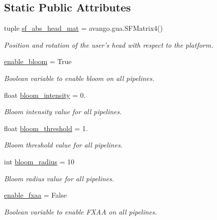 \subsection*{\-Static \-Public \-Attributes}
\begin{DoxyCompactItemize}
\item 
tuple \hyperlink{classlib_1_1User_1_1User_a633650301e37ff69cba4e51c2ed4f7a5}{sf\-\_\-abs\-\_\-head\-\_\-mat} = avango.\-gua.\-S\-F\-Matrix4()
\begin{DoxyCompactList}\small\item\em \-Position and rotation of the user's head with respect to the platform. \end{DoxyCompactList}\item 
\hyperlink{classlib_1_1User_1_1User_a6205d8d38fb4561259698293e7b89977}{enable\-\_\-bloom} = \-True
\begin{DoxyCompactList}\small\item\em \-Boolean variable to enable bloom on all pipelines. \end{DoxyCompactList}\item 
float \hyperlink{classlib_1_1User_1_1User_a4d55fc3c26e44b1ef40c00f4949ad58c}{bloom\-\_\-intensity} = 0.
\begin{DoxyCompactList}\small\item\em \-Bloom intensity value for all pipelines. \end{DoxyCompactList}\item 
float \hyperlink{classlib_1_1User_1_1User_a506b809ff697d123606946d3c11b80ed}{bloom\-\_\-threshold} = 1.
\begin{DoxyCompactList}\small\item\em \-Bloom threshold value for all pipelines. \end{DoxyCompactList}\item 
int \hyperlink{classlib_1_1User_1_1User_aa4fba47bd0a69cca3bdf5eab595628d0}{bloom\-\_\-radius} = 10
\begin{DoxyCompactList}\small\item\em \-Bloom radius value for all pipelines. \end{DoxyCompactList}\item 
\hyperlink{classlib_1_1User_1_1User_a24f3431fbd7ec6be6d4358854cf9ba8c}{enable\-\_\-fxaa} = \-False
\begin{DoxyCompactList}\small\item\em \-Boolean variable to enable \-F\-X\-A\-A on all pipelines. \end{DoxyCompactList}\item 

\end{DoxyCompactItemize}
